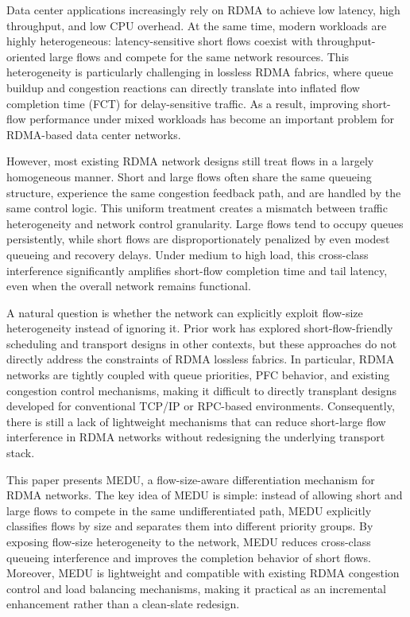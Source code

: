 \documentclass[conference]{IEEEtran}
\begin{document}
Data center applications increasingly rely on RDMA to achieve low latency, high throughput, and low CPU overhead. At the same time, modern workloads are highly heterogeneous: latency-sensitive short flows coexist with throughput-oriented large flows and compete for the same network resources. This heterogeneity is particularly challenging in lossless RDMA fabrics, where queue buildup and congestion reactions can directly translate into inflated flow completion time (FCT) for delay-sensitive traffic. As a result, improving short-flow performance under mixed workloads has become an important problem for RDMA-based data center networks.

However, most existing RDMA network designs still treat flows in a largely homogeneous manner. Short and large flows often share the same queueing structure, experience the same congestion feedback path, and are handled by the same control logic. This uniform treatment creates a mismatch between traffic heterogeneity and network control granularity. Large flows tend to occupy queues persistently, while short flows are disproportionately penalized by even modest queueing and recovery delays. Under medium to high load, this cross-class interference significantly amplifies short-flow completion time and tail latency, even when the overall network remains functional.

A natural question is whether the network can explicitly exploit flow-size heterogeneity instead of ignoring it. Prior work has explored short-flow-friendly scheduling and transport designs in other contexts, but these approaches do not directly address the constraints of RDMA lossless fabrics. In particular, RDMA networks are tightly coupled with queue priorities, PFC behavior, and existing congestion control mechanisms, making it difficult to directly transplant designs developed for conventional TCP/IP or RPC-based environments. Consequently, there is still a lack of lightweight mechanisms that can reduce short-large flow interference in RDMA networks without redesigning the underlying transport stack.

This paper presents MEDU, a flow-size-aware differentiation mechanism for RDMA networks. The key idea of MEDU is simple: instead of allowing short and large flows to compete in the same undifferentiated path, MEDU explicitly classifies flows by size and separates them into different priority groups. By exposing flow-size heterogeneity to the network, MEDU reduces cross-class queueing interference and improves the completion behavior of short flows. Moreover, MEDU is lightweight and compatible with existing RDMA congestion control and load balancing mechanisms, making it practical as an incremental enhancement rather than a clean-slate redesign.
\end{document}
